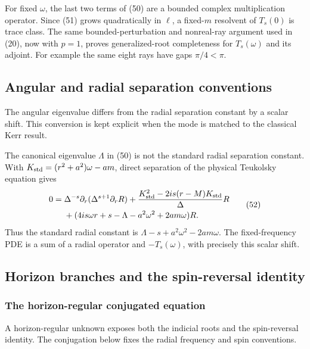 \documentclass[11pt,a4paper]{article}
\begin{document}
For fixed \(\omega\), the last two terms of (50) are a bounded complex
multiplication operator. Since (51) grows quadratically in \(\ell\), a
fixed-\(m\) resolvent of \(T_s(0)\) is trace class. The same
bounded-perturbation and nonreal-ray argument used in (20), now with
\(p=1\), proves generalized-root completeness for \(T_s(\omega)\) and
its adjoint. For example the same eight rays have gaps \(\pi/4<\pi\).

\subsection{Angular and radial separation conventions}\label{readable-kerr-normalization}

The angular eigenvalue differs from the radial separation constant by a scalar shift. This conversion is kept explicit when the mode is matched to the classical Kerr result.

The canonical eigenvalue \(\Lambda\) in (50) is not the
standard radial separation constant. With
\(K_{\rm std}=(r^2+a^2)\omega-am\), direct separation of the physical
Teukolsky equation gives \[
\begin{split}
0={}&\Delta^{-s}\partial_r(\Delta^{s+1}\partial_r R)
 +\frac{K_{\rm std}^2-2is(r-M)K_{\rm std}}{\Delta}R\\
 &+(4is\omega r+s-\Lambda-a^2\omega^2+2am\omega)R .
\end{split}
 \tag{52}
\] Thus the standard radial constant is
\(\Lambda-s+a^2\omega^2-2am\omega\). The fixed-frequency PDE is a sum of
a radial operator and \(-T_s(\omega)\), with precisely this scalar
shift.

\subsection{Horizon branches and the spin-reversal
identity}\label{horizon-branches-and-the-spin-reversal-identity}

\subsubsection{The horizon-regular conjugated equation}\label{readable-kerr-conjugation}

A horizon-regular unknown exposes both the indicial roots and the spin-reversal identity. The conjugation below fixes the radial frequency and spin conventions.
\end{document}
